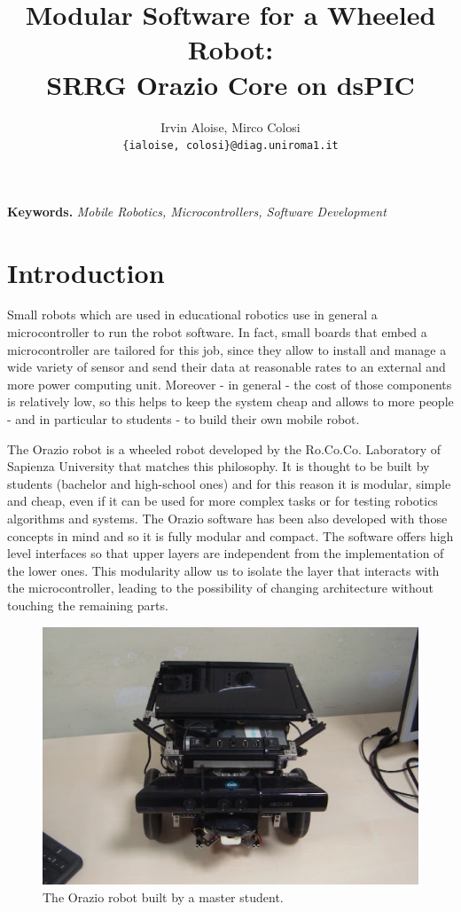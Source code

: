 \documentclass[10pt,a4paper, notitlepage]{report}
\title{Modular Software for a Wheeled Robot:\\SRRG Orazio Core on dsPIC}
\author{Irvin Aloise, Mirco Colosi\\ \tt\small \{ialoise, colosi\}@diag.uniroma1.it}
\begin{document}
\maketitle


\textbf{Keywords.} \textit{Mobile Robotics, Microcontrollers, Software Development}

\section*{Introduction} \label{sec:intro}
\lettrine{S}{}mall robots which are used in educational robotics use in general a microcontroller to run the robot software. In fact, small boards that embed a microcontroller are tailored for this job, since they allow to install and manage a wide variety of sensor and send their data at reasonable rates to an external and more power computing unit. Moreover - in general - the cost of those components is relatively low, so this helps to keep the system cheap and allows to more people - and in particular to students - to build their own mobile robot.

The Orazio robot is a wheeled robot developed by the Ro.Co.Co. Laboratory of Sapienza University that matches this philosophy. It is thought to be built by students (bachelor and high-school ones) and for this reason it is modular, simple and cheap, even if it can be used for more complex tasks or for testing robotics algorithms and systems. The Orazio software has been also developed with those concepts in mind and so it is fully modular and compact. The software offers high level interfaces so that upper layers are independent from the implementation of the lower ones. This modularity allow us to isolate the layer that interacts with the microcontroller, leading to the possibility of changing architecture without touching the remaining parts.

\begin{figure}[!h]
  \centering
  \includegraphics[width=0.75\linewidth]{pics/orazio}
  \caption{The Orazio robot built by a master student.}
  \label{fig:orazio}
\end{figure}
\end{document}
